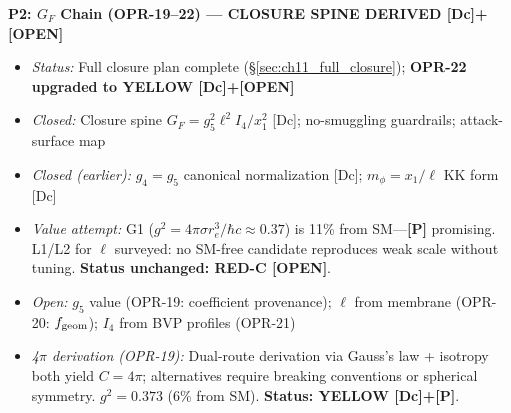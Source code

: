 \begin{tcolorbox}[colback=blue!5, colframe=blue!60!black,
    title=\textbf{OPR Closure Plan: Prioritized Research Program}]
\textbf{P2: $G_F$ Chain (OPR-19--22) --- CLOSURE SPINE DERIVED [Dc]+[OPEN]}
\begin{itemize}[nosep]
    \item \emph{Status:} Full closure plan complete (\S\ref{sec:ch11_full_closure}); \textbf{OPR-22 upgraded to YELLOW [Dc]+[OPEN]}
    \item \emph{Closed:} Closure spine $G_F = g_5^2 \ell^2 I_4 / x_1^2$ [Dc]; no-smuggling guardrails; attack-surface map
    \item \emph{Closed (earlier):} $g_4 = g_5$ canonical normalization [Dc]; $m_\phi = x_1/\ell$ KK form [Dc]
    \item \emph{Value attempt:} G1 ($g^2 = 4\pi\sigma r_e^3/\hbar c \approx 0.37$) is 11\% from SM---\textbf{[P]} promising.
          L1/L2 for $\ell$ surveyed: no SM-free candidate reproduces weak scale without tuning. \textbf{Status unchanged: RED-C [OPEN]}.
    \item \emph{Open:} $g_5$ value (OPR-19: coefficient provenance); $\ell$ from membrane (OPR-20: $f_{\rm geom}$); $I_4$ from BVP profiles (OPR-21)
    \item \emph{4$\pi$ derivation (OPR-19):} Dual-route derivation via Gauss's law + isotropy both yield $C = 4\pi$; alternatives require breaking conventions or spherical symmetry. $g^2 = 0.373$ (6\% from SM). \textbf{Status: YELLOW [Dc]+[P]}.

\end{itemize}
\end{tcolorbox}
